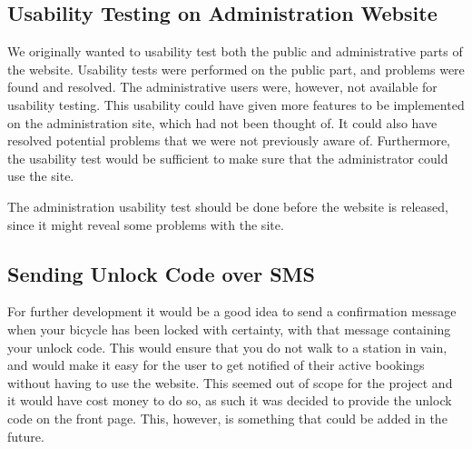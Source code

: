 \subsection{Usability Testing on Administration Website}
We originally wanted to usability test both the public and administrative parts of the website.
Usability tests were performed on the public part, and problems were found and resolved. 
The administrative users were, however, not available for usability testing.
This usability could have given more features to be implemented on the administration site, which had not been thought of.
It could also have resolved potential problems that we were not previously aware of.
Furthermore, the usability test would be sufficient to make sure that the administrator could use the site.

The administration usability test should be done before the website is released, since it might reveal some problems with the site.

\subsection{Sending Unlock Code over SMS}
For further development it would be a good idea to send a confirmation message when your bicycle has been locked with certainty, with that message containing your unlock code.
This would ensure that you do not walk to a station in vain, and would make it easy for the user to get notified of their active bookings without having to use the website.
This seemed out of scope for the project and it would have cost money to do so, as such it was decided to provide the unlock code on the front page. 
This, however, is something that could be added in the future.